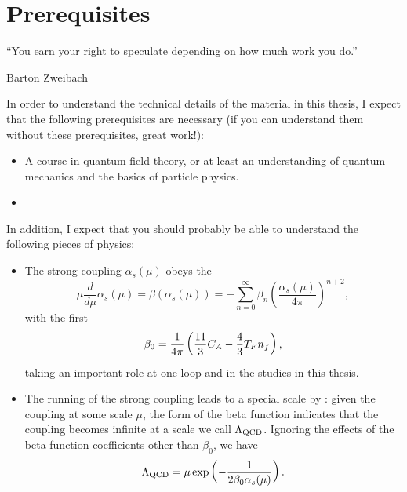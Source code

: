 \section*{Prerequisites}

\epigraph{``You earn your right to speculate depending on how much work you do.''}{Barton Zweibach}

In order to understand the technical details of the material in this thesis, I expect that the following prerequisites are necessary (if you can understand them without these prerequisites, great work!):
\begin{itemize}
    \item
        A course in quantum field theory, or at least an understanding of quantum mechanics and the basics of particle physics.

    \item

\end{itemize}

In addition, I expect that you should probably be able to understand the following pieces of physics:
\begin{itemize}
    \item
        The strong coupling \(\alpha_s(\mu)\) obeys the 
        \begin{equation}
        \mu \frac{d}{d\mu} \alpha_s(\mu) = \beta(\alpha_s(\mu))
        =
        - \sum_{n=0}^\infty \beta_n
        {\left(\frac{\alpha_s(\mu)}{4\pi}\right)}^{n+2},
        \end{equation}
         with the first 
        \begin{equation}
            \beta_0
            =
            \frac{1}{4\pi}\left(
                \frac{11}{3} C_A - \frac{4}{3} T_F n_f
            \right)
            ,
        \end{equation}
        taking an important role at one-loop and in the studies in this thesis.

    \item
        The running of the strong coupling leads to a special scale by :
        given the coupling at some scale \(\mu\), the form of the beta function indicates that the coupling becomes infinite at a scale we call \(\Lambda_{\mathrm{QCD}}\).
        Ignoring the effects of the beta-function coefficients other than \(\beta_0\), we have
        \begin{equation}
            \Lambda_{\mathrm{QCD}} = \mu \exp\left(-\frac{1}{2\beta_0 \alpha_s(\mu)}\right).
        \end{equation}
\end{itemize}



